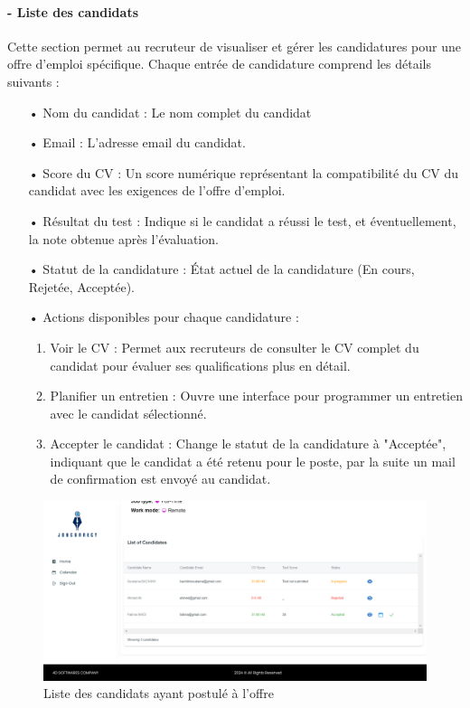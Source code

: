 \paragraph*{- Liste des candidats}
Cette section permet au recruteur de visualiser et gérer les candidatures pour une offre d'emploi spécifique. 
Chaque entrée de candidature comprend les détails suivants :
\begin{itemize}
   \item[•] Nom du candidat : Le nom complet du candidat
   \item[•] Email : L'adresse email du candidat.
   \item[•] Score du CV : Un score numérique représentant la compatibilité du CV du candidat avec les exigences de l'offre d'emploi.
   \item[•] Résultat du test : Indique si le candidat a réussi le test, et éventuellement, la note obtenue après l'évaluation.
   \item[•] Statut de la candidature : État actuel de la candidature (En cours, Rejetée, Acceptée).
   \item[•] Actions disponibles pour chaque candidature :
      \begin{enumerate}
         \item Voir le CV : Permet aux recruteurs de consulter le CV complet du candidat pour évaluer ses qualifications plus en détail.
         \item Planifier un entretien : Ouvre une interface pour programmer un entretien avec le candidat sélectionné.
         \item Accepter le candidat : Change le statut de la candidature à "Acceptée", indiquant que le candidat a été retenu pour le poste,
         par la suite un mail de confirmation est envoyé au candidat. 
         \newline
         \newline
      \end{enumerate}
\end{itemize}
\vspace{3cm}
\begin{figure}[htbp]
   \centering
   \includegraphics[scale=0.18]{screens/listCandidates.png}
   \caption{Liste des candidats ayant postulé à l'offre}
   \label{fig:candidaturesRec}
\end{figure}

